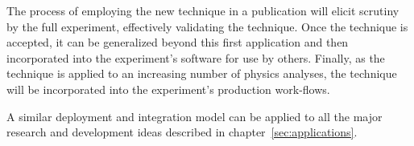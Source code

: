 The process of employing the new technique in a publication will elicit scrutiny by the full experiment, effectively validating the technique. Once the technique is accepted, it can be generalized beyond this first application and then incorporated into the experiment's software for use by others. Finally, as the technique is applied to an increasing number of physics analyses, the technique will be incorporated into the experiment's production work-flows.

A similar deployment and integration model can be applied to all the major research and development ideas described in chapter~\ref{sec:applications}.



